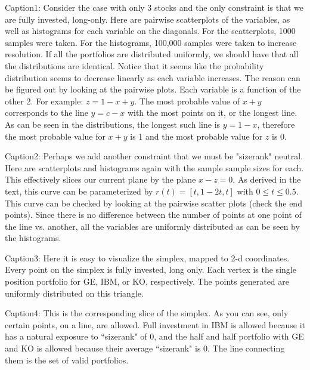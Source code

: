\documentclass{article}\usepackage{graphicx, color}
\begin{document}
Caption1:
Consider the case with only 3 stocks and the only constraint is that we are fully invested, long-only. Here are pairwise scatterplots of the variables, as well as histograms for each variable on the diagonals. For the scatterplots, 1000 samples were taken. For the histograms, 100,000 samples were taken to increase resolution. If all the portfolios are distributed uniformly, we should have that all the distributions are identical. Notice that it seems like the probability distribution seems to decrease linearly as each variable increases. The reason can be figured out by looking at the pairwise plots. Each variable is a function of the other 2. For example: $z = 1 - x+y$. The most probable value of $x+y$ corresponds to the line $y= c-x$ with the most points on it, or the longest line. As can be seen in the distributions, the longest such line is $y=1-x$, therefore the most probable value for $x+y$ is 1 and the most probable value for $z$ is 0. 

Caption2: 
Perhaps we add another constraint that we must be "sizerank" neutral. Here are scatterplots and histograms again with the sample sample sizes for each. This effectively slices our current plane by the plane $x - z = 0$. As derived in the text, this curve can be parameterized by $r(t) = [t, 1 - 2t, t]$ with $0 \le t \le 0.5$. This curve can be checked by looking at the pairwise scatter plots (check the end points). Since there is no difference between the number of points at one point of the line vs. another, all the variables are uniformly distributed as can be seen by the histograms. 

Caption3: 
Here it is easy to visualize the simplex, mapped to 2-d coordinates. Every point on the simplex is fully invested, long only. Each vertex is the single position portfolio for GE, IBM, or KO, respectively. The points generated are uniformly distributed on this triangle. 

Caption4:
This is the corresponding slice of the simplex. As you can see, only certain points, on a line, are allowed. Full investment in IBM is allowed because it has a natural exposure to ``sizerank" of 0, and the half and half portfolio with GE and KO is allowed because their average ``sizerank" is 0. The line connecting them is the set of valid portfolios. 
\end{document}
